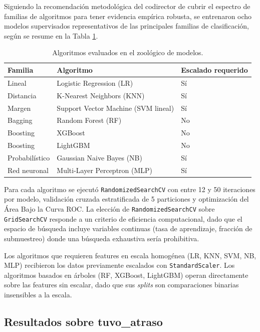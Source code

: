 \documentclass[12pt,letterpaper,oneside]{report}
\begin{document}
Siguiendo la recomendación metodológica del codirector de cubrir el espectro
de familias de algoritmos para tener evidencia empírica robusta, se
entrenaron ocho modelos supervisados representativos de las principales
familias de clasificación, según se resume en la Tabla \ref{tab:zoologico}.

\begin{table}[h!]
\centering
\caption{Algoritmos evaluados en el zoológico de modelos.}
\label{tab:zoologico}
\begin{tabular}{lll}
\toprule
\textbf{Familia} & \textbf{Algoritmo} & \textbf{Escalado requerido} \\
\midrule
Lineal & Logistic Regression (LR) & Sí \\
Distancia & K-Nearest Neighbors (KNN) & Sí \\
Margen & Support Vector Machine (SVM lineal) & Sí \\
Bagging & Random Forest (RF) & No \\
Boosting & XGBoost & No \\
Boosting & LightGBM & No \\
Probabilístico & Gaussian Naive Bayes (NB) & Sí \\
Red neuronal & Multi-Layer Perceptron (MLP) & Sí \\
\bottomrule
\end{tabular}
\end{table}

Para cada algoritmo se ejecutó \texttt{RandomizedSearchCV} con entre 12 y 50
iteraciones por modelo, validación cruzada estratificada de 5 particiones y
optimización del Área Bajo la Curva ROC. La elección de
\texttt{RandomizedSearchCV} sobre \texttt{GridSearchCV} responde a un criterio
de eficiencia computacional, dado que el espacio de búsqueda incluye
variables continuas (tasa de aprendizaje, fracción de submuestreo) donde una
búsqueda exhaustiva sería prohibitiva.

Los algoritmos que requieren features en escala homogénea (LR, KNN, SVM, NB,
MLP) recibieron los datos previamente escalados con \texttt{StandardScaler}.
Los algoritmos basados en árboles (RF, XGBoost, LightGBM) operan directamente
sobre las features sin escalar, dado que sus \emph{splits} son comparaciones
binarias insensibles a la escala.

\subsection{Resultados sobre tuvo\_atraso}
\end{document}
